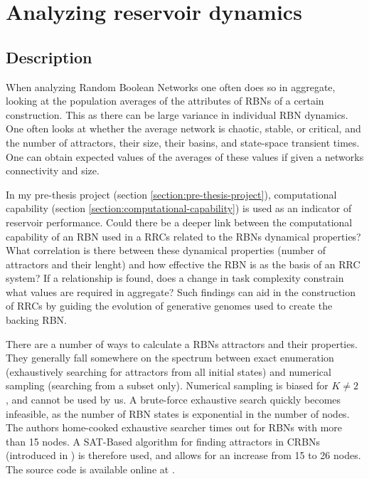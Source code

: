 \section{Analyzing reservoir dynamics}

\subsection{Description}

When analyzing Random Boolean Networks one often does so in aggregate,
looking at the population averages of the attributes of RBNs of a certain construction.
This as there can be large variance in individual RBN dynamics.
One often looks at whether the average network is chaotic, stable, or critical,
and the number of attractors, their size, their basins, and state-space transient times.
One can obtain expected values of the averages of these values if given a networks connectivity and size.

In my pre-thesis project (section \ref{section:pre-thesis-project}),
computational capability (section \ref{section:computational-capability}) is used as an indicator of reservoir performance.
Could there be a deeper link between the computational capability of an RBN used in a RRCs related to the RBNs dynamical properties?
What correlation is there between these dynamical properties (number of attractors and their lenght)
and how effective the RBN is as the basis of an RRC system?
If a relationship is found, does a change in task complexity constrain what values are required in aggregate?
Such findings can aid in the construction of RRCs by guiding the evolution of generative genomes used to create the backing RBN.

There are a number of ways to calculate a RBNs attractors and their properties.
They generally fall somewhere on the spectrum between exact enumeration (exhaustively searching for attractors from all initial states) and numerical sampling (searching from a subset only).
Numerical sampling is biased for $K\neq2$ \cite{berdahl2009random}, and cannot be used by us.
A brute-force exhaustive search quickly becomes infeasible, as the number of RBN states is exponential in the number of nodes.
The authors home-cooked exhaustive searcher times out for RBNs with more than 15 nodes.
A SAT-Based algorithm for finding attractors in CRBNs (introduced in \cite{dubrova2011sat}) is therefore used,
and allows for an increase from 15 to 26 nodes.
The source code is available online at \cite{dubrova2011sat-online}.

